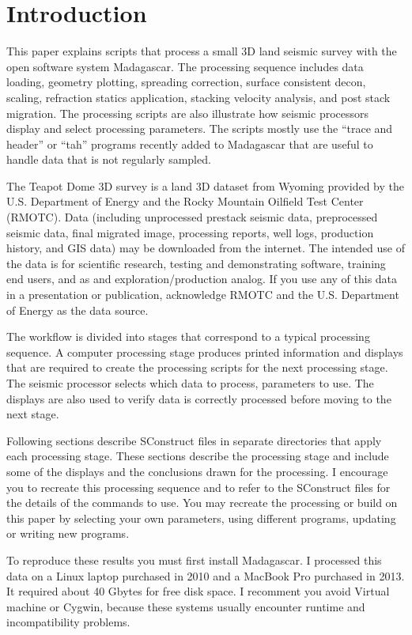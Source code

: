 \section{Introduction}
This paper explains scripts that process a small 3D land seismic survey with the open software system Madagascar.  The processing sequence includes data loading, geometry plotting, spreading correction, surface consistent decon, scaling, refraction statics application, stacking velocity analysis, and post stack migration.  The processing scripts are also illustrate how seismic processors display and select processing parameters.  The scripts mostly use the “trace and header” or “tah” programs recently added to Madagascar that are useful to handle data that is not regularly sampled. 

The Teapot Dome 3D survey is a land 3D dataset from Wyoming provided by the U.S. Department of Energy and the Rocky Mountain Oilfield Test Center (RMOTC).  Data (including unprocessed prestack seismic data, preprocessed seismic data, final migrated image, processing reports, well logs, production history, and GIS data) may be downloaded from the internet.    The intended use of the data is for scientific research, testing and demonstrating software, training end users, and as and exploration/production analog.  If you use any of this data in a presentation or publication, acknowledge RMOTC and the U.S. Department of Energy as the data source.

The workflow is divided into stages that correspond to a typical processing sequence.  A computer processing stage produces printed information and displays that are required to create the processing scripts for the next processing stage.  The seismic processor selects which data to process, parameters to use.  The displays are also used to verify data is correctly processed before moving to the next stage.

Following sections describe SConstruct files in separate directories that apply each processing stage.  These sections describe the processing stage and include some of the displays and the conclusions drawn for the processing.  I encourage you to recreate this processing sequence and to refer to the SConstruct files for the details of the commands to use.  You may recreate the processing or build on this paper by selecting your own parameters, using different programs, updating or writing new programs.  

To reproduce these results you must first install Madagascar.  I processed this data on a Linux laptop purchased in 2010 and a MacBook Pro purchased in 2013.  It required about 40 Gbytes for free disk space.  I recomment you avoid Virtual machine or Cygwin, because these systems usually encounter runtime and incompatibility problems.  

